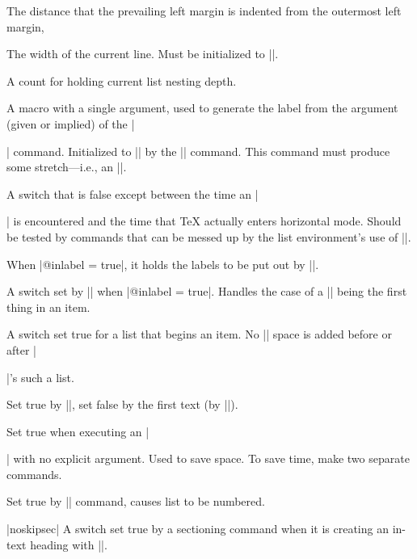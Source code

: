  \begin{description}
 \item[]  The distance that the prevailing left
     margin is indented from the outermost left margin,
 \item[]  The width of the current line.  Must be
     initialized to |\hsize|.
 \item[]  A count for holding current list nesting depth.
 
 \item[]  A macro with a single argument, used to
   generate the label from the argument (given or implied)
   of the |\item| command. Initialized to |\@mklab| by the |\list|
   command.  This command must produce  some stretch---i.e., an
   |\hfil|.
   
 \item[]  A switch that is false except between the time
   an |\item| is encountered and the time that \TeX{}
   actually enters horizontal mode.  Should be tested by commands
   that can be messed up by the list environment's use of |\everypar|.
   
 \item[]  When |@inlabel = true|, it holds the labels
   to be put out by |\everypar|.
   
 \item[]  A switch set by |\list| when
   |@inlabel = true|.
      Handles the case of a |\list| being the first thing in an item.
      
 \item[]  A switch set true for a list that begins an
   item.  No |\topsep| space is added before or after |\item|'s such a
   list.
   
 \item[]  Set true by |\list|, set false by the first
   text (by |\everypar|).
   
 \item[]   Set true when executing an |\item| with no
   explicit argument.  Used to save space. To save time, make two
   separate   commands.
   
 \item[]  Set true by |\usecounter| command, causes
   list to be numbered.
   
 \item[] |noskipsec| A switch set true by a sectioning command when
    it is creating an in-text heading with |\everypar|.
 \end{description}


